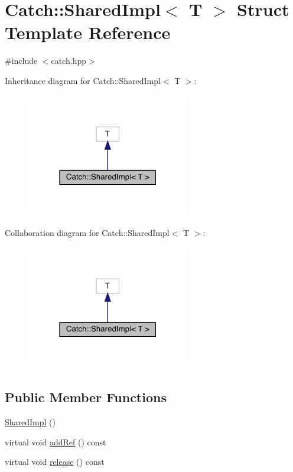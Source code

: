 \hypertarget{struct_catch_1_1_shared_impl}{}\section{Catch\+:\+:Shared\+Impl$<$ T $>$ Struct Template Reference}
\label{struct_catch_1_1_shared_impl}


{\ttfamily \#include $<$catch.\+hpp$>$}



Inheritance diagram for Catch\+:\+:Shared\+Impl$<$ T $>$\+:
\nopagebreak
\begin{figure}[H]
\begin{center}
\leavevmode
\includegraphics[width=202pt]{struct_catch_1_1_shared_impl__inherit__graph}
\end{center}
\end{figure}


Collaboration diagram for Catch\+:\+:Shared\+Impl$<$ T $>$\+:
\nopagebreak
\begin{figure}[H]
\begin{center}
\leavevmode
\includegraphics[width=202pt]{struct_catch_1_1_shared_impl__coll__graph}
\end{center}
\end{figure}
\subsection*{Public Member Functions}
\begin{DoxyCompactItemize}
\item 
\hyperlink{struct_catch_1_1_shared_impl_a0629856ee353298b61ad52cf60e716fb}{Shared\+Impl} ()
\item 
virtual void \hyperlink{struct_catch_1_1_shared_impl_a5d1a4c96e8fc07c821890fd09749062e}{add\+Ref} () const
\item 
virtual void \hyperlink{struct_catch_1_1_shared_impl_ada8052c6f24fd73ec099333626f106fe}{release} () const
\end{DoxyCompactItemize}
